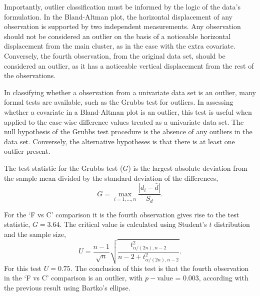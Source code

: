 \documentclass[Chap1main.tex]{subfiles}
\begin{document}
Importantly, outlier classification must be informed by the logic of the
data's formulation. In the Bland-Altman plot, the horizontal displacement of any
observation is supported by two independent measurements. Any
observation should not be considered an outlier on the basis of a
noticeable horizontal displacement from the main cluster, as in
the case with the extra covariate. Conversely, the fourth
observation, from the original data set, should be considered an
outlier, as it has a noticeable vertical displacement from the
rest of the observations.



In classifying whether a observation from a univariate data set is
an outlier, many formal tests are available, such as the Grubbs test for outliers. In assessing
whether a covariate in a Bland-Altman plot is an outlier, this
test is useful when applied to the case-wise difference values treated as a
univariate data set. The null hypothesis of the Grubbs test procedure is the absence
of any outliers in the data set. Conversely, the alternative hypotheses is that there is at least one outlier
present.

The test statistic for the Grubbs test ($G$) is the largest
absolute deviation from the sample mean divided by the standard
deviation of the differences,
\[
G =  \displaystyle\max_{i=1,\ldots, n}\frac{\left \vert d_i -
\bar{d}\right\vert}{S_{d}}.
\]

For the `F vs C' comparison it is the fourth observation gives
rise to the test statistic, $G = 3.64$. The critical value is
calculated using Student's $t$ distribution and the sample size,
\[
U = \frac{n-1}{\sqrt{n}} \sqrt{\frac{t_{\alpha/(2n),n-2}^2}{n - 2
+ t_{\alpha/(2n),n-2}^2}}.
\]
For this test $U = 0.75$. The conclusion of this test is that the fourth observation in the `F vs C' comparison is an outlier, with $p-$value = 0.003, according with the previous result using Bartko's ellipse.
\end{document}
